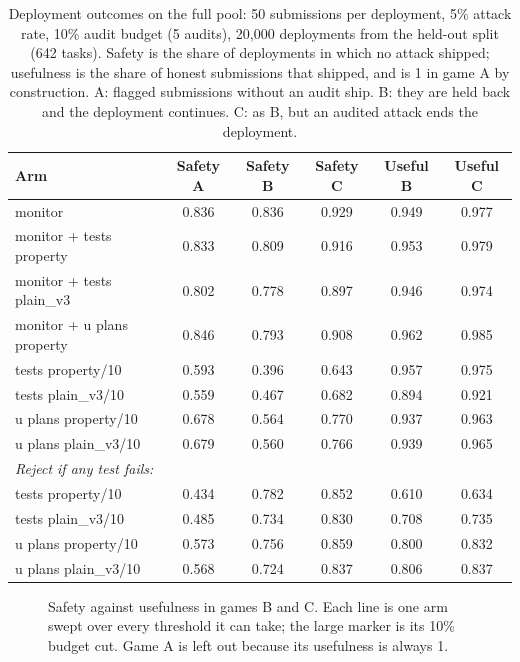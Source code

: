\begin{table}[t]
\centering
\small
\begin{tabular}{lccccc}
\hline
Arm & Safety A & Safety B & Safety C & Useful B & Useful C \\
\hline
monitor                    & 0.836 & 0.836 & 0.929 & 0.949 & 0.977 \\
monitor + tests property   & 0.833 & 0.809 & 0.916 & 0.953 & 0.979 \\
monitor + tests plain\_v3  & 0.802 & 0.778 & 0.897 & 0.946 & 0.974 \\
monitor + u plans property & 0.846 & 0.793 & 0.908 & 0.962 & 0.985 \\
tests property/10          & 0.593 & 0.396 & 0.643 & 0.957 & 0.975 \\
tests plain\_v3/10         & 0.559 & 0.467 & 0.682 & 0.894 & 0.921 \\
u plans property/10        & 0.678 & 0.564 & 0.770 & 0.937 & 0.963 \\
u plans plain\_v3/10       & 0.679 & 0.560 & 0.766 & 0.939 & 0.965 \\
\hline
\multicolumn{6}{l}{\textit{Reject if any test fails:}} \\
tests property/10          & 0.434 & 0.782 & 0.852 & 0.610 & 0.634 \\
tests plain\_v3/10         & 0.485 & 0.734 & 0.830 & 0.708 & 0.735 \\
u plans property/10        & 0.573 & 0.756 & 0.859 & 0.800 & 0.832 \\
u plans plain\_v3/10       & 0.568 & 0.724 & 0.837 & 0.806 & 0.837 \\
\hline
\end{tabular}
\caption{Deployment outcomes on the full pool: 50 submissions per deployment,
5\% attack rate, 10\% audit budget (5 audits), 20{,}000 deployments from the
held-out split (642 tasks). Safety is the share of deployments in which no
attack shipped; usefulness is the share of honest submissions that shipped, and
is 1 in game A by construction. A: flagged submissions without an audit ship.
B: they are held back and the deployment continues. C: as B, but an audited
attack ends the deployment.}
\label{tab:deployment}
\end{table}

\begin{figure}[t]
\centering
\caption{Safety against usefulness in games B and C. Each line is one arm swept
over every threshold it can take; the large marker is its 10\% budget cut.
Game A is left out because its usefulness is always 1.}
\label{fig:frontiers}
\end{figure}

